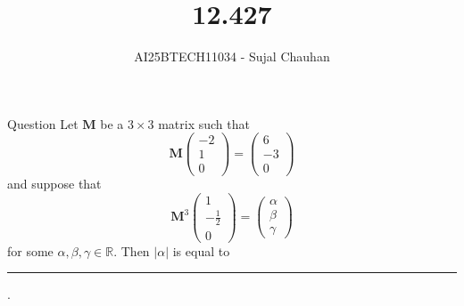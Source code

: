 \documentclass{beamer}
\title
{12.427}
\author 
{AI25BTECH11034 - Sujal Chauhan }
\begin{document}
\frame{\titlepage}
\begin{frame}{Question}
    Let $\mathbf{M}$ be a $3 \times 3$ matrix such that
\[
\mathbf{M} \begin{pmatrix} -2 \\ 1 \\ 0 \end{pmatrix} = \begin{pmatrix} 6 \\ -3 \\ 0 \end{pmatrix}
\]
and suppose that
\[
\mathbf{M}^3 \begin{pmatrix} 1 \\ -\frac{1}{2} \\ 0 \end{pmatrix} = \begin{pmatrix} \alpha \\ \beta \\ \gamma \end{pmatrix}
\]
for some $\alpha, \beta, \gamma \in \mathbb{R}$. Then $|\alpha|$ is equal to \rule{2cm}{0.15mm}.

\end{frame}
\end{document}
